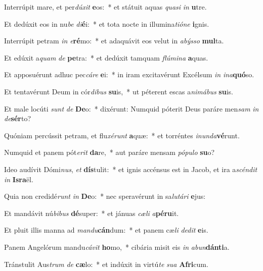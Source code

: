 \item Interrúpit mare, et per\textit{dú}\textit{xit} \textbf{e}os:~* et státuit aquas \textit{qua}\textit{si} \textit{in} \textbf{u}tre.
\item Et dedúxit eos in nu\textit{be} \textit{di}\textbf{é}i:~* et tota nocte in illumina\textit{ti}\textit{ó}\textit{ne} \textbf{i}gnis.
\item Interrúpit petram \textit{in} \textit{e}\textbf{ré}mo:~* et adaquávit eos velut in \textit{a}\textit{býs}\textit{so} \textbf{mul}ta.
\item Et edúxit a\textit{quam} \textit{de} \textbf{pe}tra:~* et dedúxit tamquam \textit{flú}\textit{mi}\textit{na} \textbf{a}quas.
\item Et apposuérunt adhuc pec\textit{cá}\textit{re} \textbf{e}i:~* in iram excitavérunt Excélsum \textit{in} \textit{in}\textit{a}\textbf{quó}so.
\item Et tentavérunt Deum in cór\textit{di}\textit{bus} \textbf{su}is,~* ut péterent escas a\textit{ni}\textit{má}\textit{bus} \textbf{su}is.
\item Et male locúti \textit{sunt} \textit{de} \textbf{De}o:~* dixérunt: Numquid póterit Deus paráre men\textit{sam} \textit{in} \textit{de}\textbf{sér}to?
\item Quóniam percússit petram, et flu\textit{xé}\textit{runt} \textbf{a}quæ:~* et torréntes \textit{in}\textit{un}\textit{da}\textbf{vé}runt.
\item Numquid et panem pót\textit{e}\textit{rit} \textbf{da}re,~* aut paráre mensam \textit{pó}\textit{pu}\textit{lo} \textbf{su}o?
\item Ideo audívit Dómi\textit{nus}, \textit{et} \textbf{dís}tulit:~* et ignis accénsus est in Jacob, et ira a\textit{scén}\textit{dit} \textit{in} \textbf{Is}\textbf{ra}ël.
\item Quia non credidé\textit{runt} \textit{in} \textbf{De}o:~* nec speravérunt in sa\textit{lu}\textit{tá}\textit{ri} \textbf{e}jus:
\item Et mandávit nú\textit{bi}\textit{bus} \textbf{dé}super:~* et jánuas \textit{cæ}\textit{li} \textit{a}\textbf{pé}\textbf{ru}it.
\item Et pluit illis manna ad \textit{man}\textit{du}\textbf{cán}dum:~* et panem cæ\textit{li} \textit{de}\textit{dit} \textbf{e}is.
\item Panem Angelórum mandu\textit{cá}\textit{vit} \textbf{ho}mo,~* cibária misit eis \textit{in} \textit{ab}\textit{un}\textbf{dán}\textbf{ti}a.
\item Tránstulit Aus\textit{trum} \textit{de} \textbf{cæ}lo:~* et indúxit in virtú\textit{te} \textit{su}\textit{a} \textbf{A}\textbf{fri}cum.
